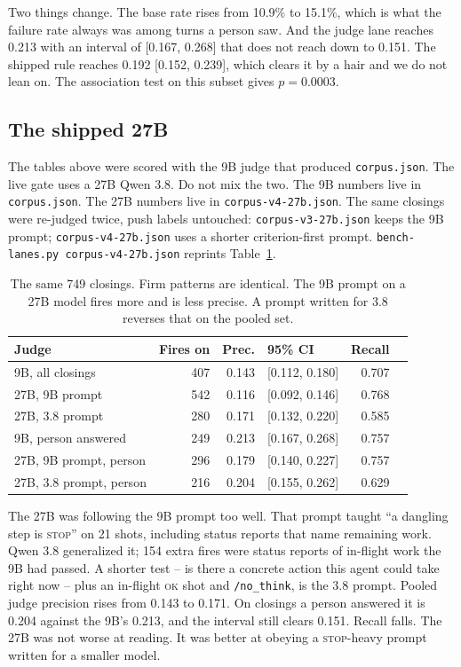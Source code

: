 Two things change. The base rate rises from 10.9\% to 15.1\%, which is
what the failure rate always was among turns a person saw. And the judge
lane reaches 0.213 with an interval of [0.167, 0.268] that does not reach
down to 0.151. The shipped rule reaches 0.192 [0.152, 0.239], which clears
it by a hair and we do not lean on. The association test on this subset
gives $p = 0.0003$.

\subsection{The shipped 27B}
\label{sec:scale}

The tables above were scored with the 9B judge that produced
\texttt{corpus.json}. The live gate uses a 27B Qwen 3.8. Do not mix the
two. The 9B numbers live in \texttt{corpus.json}. The 27B numbers live in
\texttt{corpus-v4-27b.json}. The same closings were re-judged twice, push
labels untouched:
\texttt{corpus-v3-27b.json} keeps the 9B prompt;
\texttt{corpus-v4-27b.json} uses a shorter criterion-first prompt.
\texttt{bench-lanes.py corpus-v4-27b.json} reprints Table~\ref{tab:scale}.

\begin{table}[ht]
\centering
\begin{tabular}{lrrlrr}
\toprule
Judge & Fires on & Prec. & 95\% CI & Recall \\
\midrule
9B, all closings & 407 & 0.143 & [0.112, 0.180] & 0.707 \\
27B, 9B prompt & 542 & 0.116 & [0.092, 0.146] & 0.768 \\
27B, 3.8 prompt & 280 & 0.171 & [0.132, 0.220] & 0.585 \\
9B, person answered & 249 & 0.213 & [0.167, 0.268] & 0.757 \\
27B, 9B prompt, person & 296 & 0.179 & [0.140, 0.227] & 0.757 \\
27B, 3.8 prompt, person & 216 & 0.204 & [0.155, 0.262] & 0.629 \\
\bottomrule
\end{tabular}
\caption{The same 749 closings. Firm patterns are identical. The 9B prompt
on a 27B model fires more and is less precise. A prompt written for 3.8
reverses that on the pooled set.}
\label{tab:scale}
\end{table}

The 27B was following the 9B prompt too well. That prompt taught ``a
dangling step is \textsc{stop}'' on 21 shots, including status reports that
name remaining work. Qwen 3.8 generalized it; 154 extra fires were
status reports of in-flight work the 9B had passed. A shorter test -- is
there a concrete action this agent could take right now -- plus an
in-flight \textsc{ok} shot and \texttt{/no\_think}, is the 3.8 prompt.
Pooled judge precision rises from 0.143 to 0.171. On closings a person
answered it is 0.204 against the 9B's 0.213, and the interval still
clears 0.151. Recall falls. The 27B was not worse at reading. It was
better at obeying a \textsc{stop}-heavy prompt written for a smaller model.

